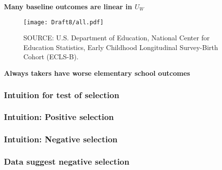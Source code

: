 \documentclass[t,aspectratio=169,11pt,presentation]{beamer}
\newenvironment{wideitemize}{\itemize\addtolength{\itemsep}{14pt}}{\enditemize}
\begin{document}

 







\begin{frame}[label=eclsb,c]{\textbf{Many baseline outcomes are linear in $U_W$}}

\begin{figure}
    \centering
    \texttt{[image: Draft8/all.pdf]}
    
    \footnotesize SOURCE: U.S. Department of Education, National Center for Education Statistics, Early Childhood Longitudinal Survey-Birth Cohort (ECLS-B).
\end{figure}

\hyperlink{redselection}{}

\end{frame}



\begin{frame}[label=out,c]{\textbf{Always takers have worse elementary school outcomes}}
\begin{center}
    \resizebox{\textwidth}{!}{
}

\end{center}
\hyperlink{redselection}{}

\end{frame}




\begin{frame}[label=rdseltest,c]

\frametitle<1-6>{\textbf{Intuition for test of selection}}
\frametitle<7>{\textbf{Intuition: Positive selection}}
\frametitle<8>{\textbf{Intuition: Negative selection}}
\frametitle<9>{\textbf{Data suggest negative selection}}



\begin{center}

\end{center}

\hyperlink{redselection}{}

\end{frame}
\end{document}
